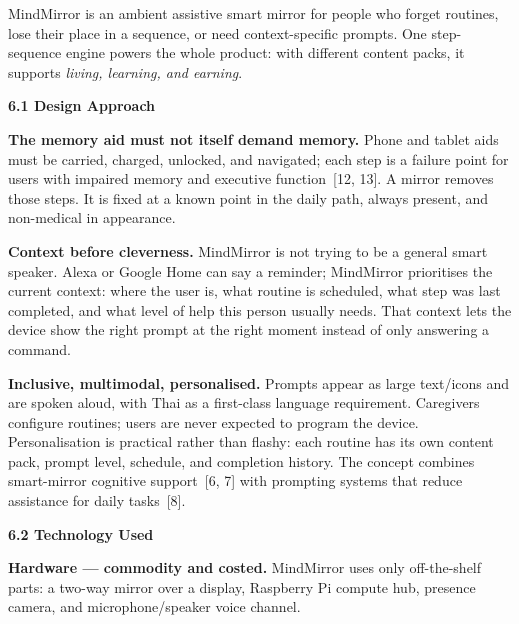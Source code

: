   \item {}

    MindMirror is an ambient assistive smart mirror for people who forget routines,
    lose their place in a sequence, or need context-specific prompts. One step-sequence
    engine powers the whole product: with different content packs, it supports
    \emph{living, learning, and earning}.

    \textbf{6.1 Design Approach}

    \textbf{The memory aid must not itself demand memory.} Phone and tablet aids must
    be carried, charged, unlocked, and navigated; each step is a failure point for
    users with impaired memory and executive function~[12, 13]. A mirror removes
    those steps. It is fixed at a known point in the daily path, always present, and
    non-medical in appearance.

    \textbf{Context before cleverness.} MindMirror is not trying to be a general smart
    speaker. Alexa or Google Home can say a reminder; MindMirror prioritises the
    current context: where the user is, what routine is scheduled, what step was last
    completed, and what level of help this person usually needs. That context lets the
    device show the right prompt at the right moment instead of only answering a
    command.

    \textbf{Inclusive, multimodal, personalised.} Prompts appear as large text/icons
    and are spoken aloud, with Thai as a first-class language requirement. Caregivers
    configure routines; users are never expected to program the device. Personalisation
    is practical rather than flashy: each routine has its own content pack, prompt
    level, schedule, and completion history. The concept combines smart-mirror cognitive
    support~[6, 7] with prompting systems that reduce assistance for daily tasks~[8].

    \textbf{6.2 Technology Used}

    \textbf{Hardware --- commodity and costed.} MindMirror uses only off-the-shelf
    parts: a two-way mirror over a display, Raspberry Pi compute hub, presence camera,
    and microphone/speaker voice channel.

